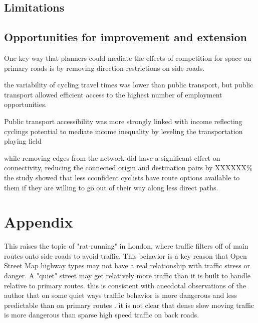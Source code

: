 \documentclass[11pt]{article} %
\begin{document}
\subsection{Limitations}

\subsection{Opportunities for improvement and extension}


One key way that planners could mediate the effects of competition for space on primary roads is by removing direction restrictions on side roads. 

the variability of cycling travel times was lower than public transport, but public transport allowed efficient access to the highest number of employment opportunities. 


Public transport accessibility was more strongly linked with income reflecting cyclings potential to mediate income inequality by leveling the transportation playing field

while removing edges from the network did have a significant effect on connectivity, reducing the connected origin and destination pairs by XXXXXX\% the study showed that less cconfident cyclists have route options available to them if they are willing to go out of their way along less direct paths. 

\section{Appendix}


This raises the topic of "rat-running" in London, where traffic filters off of main routes onto side roads to avoid traffic. This behavior is a key reason that Open Street Map highway types may not have a real relationship with traffic stress or danger. A "quiet" street may get relatively more traffic than it is built to handle relative to primary routes. this is consistent with anecdotal observations of the author that on some quiet ways trafffic behavior is more dangerous and less predictable than on primary routes . it is not clear that dense slow moving traffic is more dangerous than sparse high speed traffic on back roads. 
\end{document}
